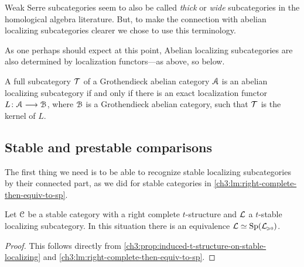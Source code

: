 \begin{remark}
    Weak Serre subcategories seem to also be called \emph{thick} or \emph{wide} subcategories in the homological algebra literature. But, to make the connection with abelian localizing subcategories clearer we chose to use this terminology. 
\end{remark}

As one perhaps should expect at this point, Abelian localizing subcategories are also determined by localization functors---as above, so below. 

\begin{proposition}
    \label{ch3:prop:abelian-localizing-iff-kernel-of-localization}
    A full subcategory $\mathcal{T}$ of a Grothendieck abelian category $\EuScript{A}$ is an abelian localizing subcategory if and only if there is an exact localization functor $L\colon\EuScript{A}\longrightarrow \EuScript{B}$, where $\EuScript{B}$ is a Grothendieck abelian category, such that $\mathcal{T}$ is the kernel of $L$. 
\end{proposition}







\subsection{Stable and prestable comparisons}

The first thing we need is to be able to recognize stable localizing subcategories by their connected part, as we did for stable categories in \cref{ch3:lm:right-complete-then-equiv-to-sp}. 

\begin{corollary}
    \label{ch3:cor:t-stable-implies-equiv-to-sp}
    Let $\EuScript{C}$ be a stable category with a right complete $t$-structure and $\mathcal{L}$ a $t$-stable localizing subcategory. In this situation there is an equivalence $\mathcal{L}\simeq \mathrm{Sp}(\mathcal{L}_{\hspace{-1pt}\scriptscriptstyle\geqslant 0})$. 
\end{corollary}
\begin{proof}
    This follows directly from \cref{ch3:prop:induced-t-structure-on-stable-localizing} and \cref{ch3:lm:right-complete-then-equiv-to-sp}.
\end{proof}

